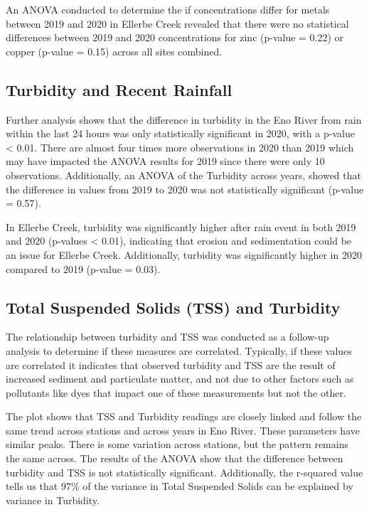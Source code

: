 \documentclass[
  12pt,
]{article}
\begin{document}
An ANOVA conducted to determine the if concentrations differ for metals
between 2019 and 2020 in Ellerbe Creek revealed that there were no
statistical differences between 2019 and 2020 concentrations for zinc
(p-value = 0.22) or copper (p-value = 0.15) across all sites combined.

\hypertarget{turbidity-and-recent-rainfall}{%
\subsection{Turbidity and Recent
Rainfall}\label{turbidity-and-recent-rainfall}}

Further analysis shows that the difference in turbidity in the Eno River
from rain within the last 24 hours was only statistically significant in
2020, with a p-value \textless{} 0.01. There are almost four times more
observations in 2020 than 2019 which may have impacted the ANOVA results
for 2019 since there were only 10 observations. Additionally, an ANOVA
of the Turbidity across years, showed that the difference in values from
2019 to 2020 was not statistically significant (p-value = 0.57).

In Ellerbe Creek, turbidity was significantly higher after rain event in
both 2019 and 2020 (p-values \textless{} 0.01), indicating that erosion
and sedimentation could be an issue for Ellerbe Creek. Additionally,
turbidity was significantly higher in 2020 compared to 2019 (p-value =
0.03).

\hypertarget{total-suspended-solids-tss-and-turbidity}{%
\subsection{Total Suspended Solids (TSS) and
Turbidity}\label{total-suspended-solids-tss-and-turbidity}}

The relationship between turbidity and TSS was conducted as a follow-up
analysis to determine if these measures are correlated. Typically, if
these values are correlated it indicates that observed turbidity and TSS
are the result of increased sediment and particulate matter, and not due
to other factors such as pollutants like dyes that impact one of these
measurements but not the other.

The plot shows that TSS and Turbidity readings are closely linked and
follow the same trend across stations and across years in Eno River.
These parameters have similar peaks. There is some variation across
stations, but the pattern remains the same across. The results of the
ANOVA show that the difference between turbidity and TSS is not
statistically significant. Additionally, the r-squared value tells us
that 97\% of the variance in Total Suspended Solids can be explained by
variance in Turbidity.
\end{document}
